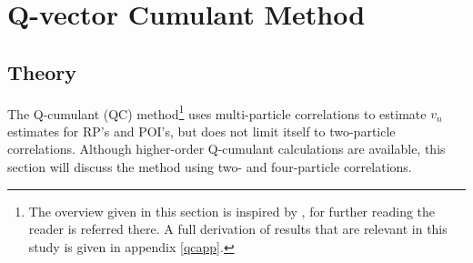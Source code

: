 \documentclass[a5paper]{book}
\numberwithin{equation}{subsection}
\begin{document}
	\section{Q-vector Cumulant Method}
	\label{qvc}
	\subsection{Theory}
	The Q-cumulant (QC) method\footnote{The overview given in this section is inspired by \cite{bilandzic-2011-83}, for further reading the reader is referred there. A full derivation of results that are relevant in this study is given in appendix \ref{qcapp}.} uses multi-particle correlations to estimate $v_n$ estimates for RP's and POI's, but does not limit itself to two-particle correlations. Although higher-order Q-cumulant calculations are available, this section will discuss the method using two- and four-particle correlations. 
		
\end{document}
